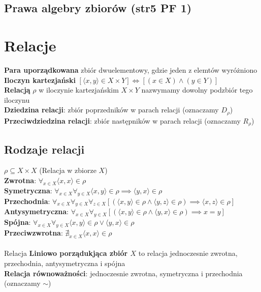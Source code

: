 \documentclass[a4paper,12pt]{article}
\begin{document}
\subsection{Prawa algebry zbiorów (str5 PF 1)}

\section{Relacje}
\textbf{Para uporządkowana} zbiór  dwuelementowy, gdzie jeden z elemtów wyróżniono \\
\textbf{Iloczyn kartezjański} $[\langle x,y \rangle \in X \times Y] \iff [(x\in X)\wedge (y\in Y)]$ \\
\textbf{Relacją} $\rho$ w iloczynie kartezjańskim $X \times Y$ nazwymamy dowolny podzbiór tego iloczynu \\
\textbf{Dziedzina relacji}: zbiór poprzedników w parach relacji (oznaczamy $D_\rho$) \\
\textbf{Przeciwdziedzina relacji}: zbiór następników w parach relacji (oznaczamy $R_\rho$)
\subsection{Rodzaje relacji}
$\rho \subseteq X \times X$ (Relacja w zbiorze $X$)\\
\textbf{Zwrotna}: $\forall_{x \in X} \langle x, x \rangle \in \rho $ \\
\textbf{Symetryczna}: $\forall_{x \in X} \forall_{y\in X}\langle x,y \rangle \in \rho \implies \langle y, x \rangle \in \rho $ \\
\textbf{Przechodnia}: $\forall_{x \in X} \forall_{y\in X} \forall_{z\in X} [(\langle x, y \rangle \in \rho \wedge \langle y, z \rangle \in \rho ) \implies \langle x, z \rangle \in \rho ]$ \\
\textbf{Antysymetryczna}: $\forall_{x \in X} \forall_{y\in X} [(\langle x, y \rangle \in \rho \wedge \langle y, x \rangle \in \rho ) \implies x=y]$ \\
\textbf{Spójna}: $\forall_{x \in X}\forall_{y\in X} \langle x,y \rangle\in\rho \vee \langle y,x\rangle\in\rho$\\
\textbf{Przeciwzwrotna}: $\nexists_{x\in X} \langle x,x\rangle \in \rho$\\
\\
Relacja \textbf{Liniowo porządukjąca zbiór $X$} to relacja jednoczesnie zwrotna, przechodnia, antysymetryczna i spójna \\
\textbf{Relacja równoważności}: jednoczesnie zwrotna, symetryczna i przechodnia (oznaczamy $ \sim $)
\end{document}
